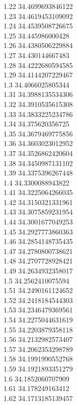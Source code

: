 {1.22	34.4699693846122\\
1.23	34.4619453109092\\
1.24	34.4539508726675\\
1.25	34.445986000428\\
1.26	34.4380506229884\\
1.27	34.430144667483\\
1.28	34.4222680594585\\
1.29	34.4144207229467\\
1.3	34.4066025805344\\
1.31	34.3988135534306\\
1.32	34.3910535615308\\
1.33	34.3833225234786\\
1.34	34.375620356725\\
1.35	34.3679469775856\\
1.36	34.3603023012952\\
1.37	34.3526862420604\\
1.38	34.3450987131102\\
1.39	34.3375396267448\\
1.4	34.3300088943822\\
1.41	34.3225064266035\\
1.42	34.3150321331961\\
1.43	34.3075859231954\\
1.44	34.3001677049253\\
1.45	34.2927773860363\\
1.46	34.2854148735435\\
1.47	34.2780800738621\\
1.48	34.2707728928421\\
1.49	34.2634932358017\\
1.5	34.2562410075594\\
1.51	34.2490161124652\\
1.52	34.2418184544303\\
1.53	34.2346479369561\\
1.54	34.2275044631619\\
1.55	34.2203879358118\\
1.56	34.2132982573407\\
1.57	34.2062353298789\\
1.58	34.1991990552768\\
1.59	34.1921893351279\\
1.6	34.1852060707909\\
1.61	34.178249163412\\
1.62	34.1713185139457\\
}
